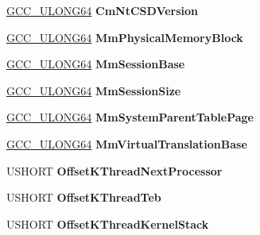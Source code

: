 \begin{DoxyCompactItemize}
\hyperlink{union___g_c_c___u_l_o_n_g64}{G\+C\+C\+\_\+\+U\+L\+O\+N\+G64} {\bfseries Cm\+Nt\+C\+S\+D\+Version}
\item 
\mbox{\label{struct___k_d_d_e_b_u_g_g_e_r___d_a_t_a64_a2e8ba4293e38182b91ed6ff9cf22e52b}} 
\hyperlink{union___g_c_c___u_l_o_n_g64}{G\+C\+C\+\_\+\+U\+L\+O\+N\+G64} {\bfseries Mm\+Physical\+Memory\+Block}
\item 
\mbox{\label{struct___k_d_d_e_b_u_g_g_e_r___d_a_t_a64_ad5160ae5c3698d79c363b543672902b6}} 
\hyperlink{union___g_c_c___u_l_o_n_g64}{G\+C\+C\+\_\+\+U\+L\+O\+N\+G64} {\bfseries Mm\+Session\+Base}
\item 
\mbox{\label{struct___k_d_d_e_b_u_g_g_e_r___d_a_t_a64_a80fe419d755f412b8f6b3ccc3d9841cd}} 
\hyperlink{union___g_c_c___u_l_o_n_g64}{G\+C\+C\+\_\+\+U\+L\+O\+N\+G64} {\bfseries Mm\+Session\+Size}
\item 
\mbox{\label{struct___k_d_d_e_b_u_g_g_e_r___d_a_t_a64_a76d0c4a72fbf94f5d87df65cd3765ae0}} 
\hyperlink{union___g_c_c___u_l_o_n_g64}{G\+C\+C\+\_\+\+U\+L\+O\+N\+G64} {\bfseries Mm\+System\+Parent\+Table\+Page}
\item 
\mbox{\label{struct___k_d_d_e_b_u_g_g_e_r___d_a_t_a64_ac21563c166b1264e40bb4b62e8d23fac}} 
\hyperlink{union___g_c_c___u_l_o_n_g64}{G\+C\+C\+\_\+\+U\+L\+O\+N\+G64} {\bfseries Mm\+Virtual\+Translation\+Base}
\item 
\mbox{\label{struct___k_d_d_e_b_u_g_g_e_r___d_a_t_a64_afd8ac4807a5b9ba5d0cba9b1198305c6}} 
U\+S\+H\+O\+RT {\bfseries Offset\+K\+Thread\+Next\+Processor}
\item 
\mbox{\label{struct___k_d_d_e_b_u_g_g_e_r___d_a_t_a64_a88df95c2dc7b7a7d024ed90a71f303c0}} 
U\+S\+H\+O\+RT {\bfseries Offset\+K\+Thread\+Teb}
\item 
\mbox{\label{struct___k_d_d_e_b_u_g_g_e_r___d_a_t_a64_a0d75d45bb5e09fe3a4203c10889fc068}} 
U\+S\+H\+O\+RT {\bfseries Offset\+K\+Thread\+Kernel\+Stack}

\end{DoxyCompactItemize}

